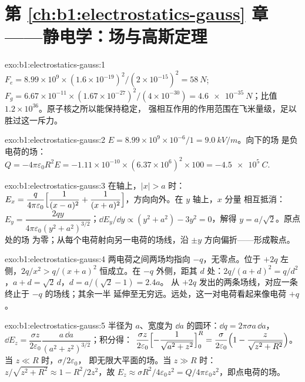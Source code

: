 \section*{第 \ref{ch:b1:electrostatics-gauss} 章——静电学：场与高斯定理}

\begin{solution}{exo:b1:electrostatics-gauss:1}
$F_e = 8.99 \times 10^9 \times (1.6 \times 10^{-19})^2/(2 \times 10^{-15})^2 = \qty{58}{N}$;
$F_g = 6.67 \times 10^{-11} \times (1.67 \times 10^{-27})^2/(4 \times 10^{-30}) =
\qty{4.6e-35}{N}$；比值 $1.2 \times 10^{36}$。原子核之所以能保持稳定，
强相互作用的作用范围在飞米量级，足以胜过这一斥力。
\end{solution}

\begin{solution}{exo:b1:electrostatics-gauss:2}
$E = 8.99 \times 10^9 \times 10^{-6}/1 = \qty{9.0}{kV/m}$。向下的场
是负电荷的场：$Q = -4\pi\varepsilon_0R^2E = -1.11 \times 10^{-10} \times
(6.37 \times 10^6)^2 \times 100 = \qty{-4.5e5}{C}$.
\end{solution}

\begin{solution}{exo:b1:electrostatics-gauss:3}
在轴上，$|x| > a$ 时：$E_x = \dfrac{q}{4\pi\varepsilon_0}\Bigl[\dfrac{1}{(x - a)^2} +
\dfrac{1}{(x + a)^2}\Bigr]$，方向向外。在 $y$ 轴上，$x$ 分量
相互抵消：$E_y = \dfrac{2qy}{4\pi\varepsilon_0(y^2 + a^2)^{3/2}}$；$\dd E_y/\dd y \propto
(y^2 + a^2) - 3y^2 = 0$，解得 $y = a/\sqrt2$。原点处的场
为零；从每个电荷射向另一电荷的场线，沿
$\pm y$ 方向偏折——形成鞍点。
\end{solution}

\begin{solution}{exo:b1:electrostatics-gauss:4}
两电荷之间两场均指向 $-q$，无零点。位于
$+2q$ 左侧，$2q/x^2 > q/(x + a)^2$ 恒成立。在 $-q$ 外侧，距其 $d$
处：$2q/(a + d)^2 = q/d^2$，$a + d = \sqrt2\,d$，$d = a/(\sqrt2 - 1) = 2.4a$。
从 $+2q$ 发出的两条场线，对应一条终止于 $-q$ 的场线；其余一半
延伸至无穷远。远处，这一对电荷看起来像电荷 $+q$。
\end{solution}

\begin{solution}{exo:b1:electrostatics-gauss:5}
半径为 $a$、宽度为 $\dd a$ 的圆环：$\dd q = 2\pi\sigma a\,\dd a$，$\dd E_z =
\dfrac{\sigma z}{2\varepsilon_0}\dfrac{a\,\dd a}{(a^2 + z^2)^{3/2}}$；积分得：
$\dfrac{\sigma z}{2\varepsilon_0}\Bigl[-\dfrac{1}{\sqrt{a^2 + z^2}}\Bigr]_0^R = \dfrac{\sigma}{2\varepsilon_0}
\Bigl(1 - \dfrac{z}{\sqrt{z^2 + R^2}}\Bigr)$。当 $z \ll R$ 时，$\sigma/2\varepsilon_0$，
即无限大平面的场。当 $z \gg R$ 时：$z/\sqrt{z^2 + R^2} \approx 1 - R^2/2z^2$，故 $E_z
\approx \sigma R^2/4\varepsilon_0z^2 = Q/4\pi\varepsilon_0z^2$，即点电荷的场。
\end{solution}

